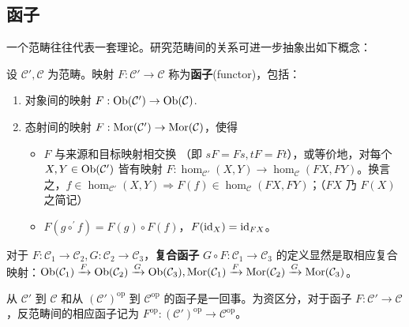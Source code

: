\subsection{函子}
一个范畴往往代表一套理论。研究范畴间的关系可进一步抽象出如下概念：
\begin{definition}
    设 $\mathcal{C}',\mathcal{C}$ 为范畴。映射 $F: \mathcal{C}' \to \mathcal{C}$ 称为\textbf{函子}(functor)，包括：
    \begin{enumerate}
        \item 对象间的映射 $F: \operatorname{Ob}(\mathcal C')\to\operatorname{Ob}(\mathcal C)$.
        \item 态射间的映射 $F: \operatorname{Mor}(\mathcal C')\to \operatorname{Mor}(\mathcal C)$，使得
            \begin{itemize}
                \item $F$ 与来源和目标映射相交换 （即 $sF=Fs,tF=Ft$），或等价地，对每个 $X, Y \in \operatorname{Ob}(\mathcal{C}')$ 皆有映射 $F: \hom_{\mathcal{C}'}(X, Y) \to \hom_{\mathcal{C}}(FX, FY)$。换言之，$f\in \hom_{\mathcal{C}'}(X, Y)\Rightarrow F(f)\in \hom_{\mathcal{C}}(FX, FY)$；（$FX$ 乃 $F(X)$ 之简记）
                \item $F(g\circ^{\prime} f) = F(g) \circ F(f)$，$F(\mathrm{id}_X) = \mathrm{id}_{FX}$。
            \end{itemize}
    \end{enumerate}
    对于 $F: \mathcal{C}_1 \to \mathcal{C}_2,G: \mathcal{C}_2 \to \mathcal{C}_3$，\textbf{复合函子} $G \circ F: \mathcal{C}_1 \to \mathcal{C}_3$ 的定义显然是取相应复合映射：$\operatorname{Ob}(\mathcal{C}_1) \xrightarrow{F} \operatorname{Ob}(\mathcal{C}_2) \xrightarrow{G} \operatorname{Ob}(\mathcal{C}_3), \operatorname{Mor}(\mathcal{C}_1) \xrightarrow{F} \operatorname{Mor}(\mathcal{C}_2) \xrightarrow{G} \operatorname{Mor}(\mathcal{C}_3)$。
\end{definition}

\begin{remark}
	从 $\mathcal{C}'$ 到 $\mathcal{C}$ 和从 $(\mathcal{C}')^\mathrm{op}$ 到 $\mathcal{C}^\mathrm{op}$ 的函子是一回事。为资区分，对于函子 $F: \mathcal{C}' \to \mathcal{C}$，反范畴间的相应函子记为 $F^\mathrm{op}: (\mathcal{C}')^\mathrm{op} \to \mathcal{C}^\mathrm{op}$。
\end{remark}

